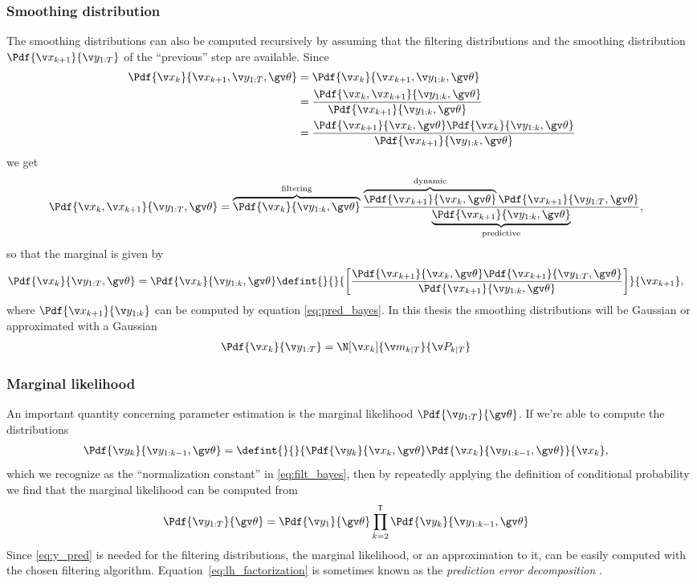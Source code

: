 \subsubsection*{Smoothing distribution}
The smoothing distributions can also be computed recursively by assuming that the filtering distributions
and the smoothing distribution $\Pdf{\x_{k+1}}{\y_{1:T}}$ of the ``previous'' step are available.
Since
\begin{align*}
	\Pdf{\xk}{\x_{k+1},\y_{1:T},\Th}&=\Pdf{\xk}{\x_{k+1},\y_{1:k},\Th}\\
	&=\frac{\Pdf{\xk,\x_{k+1}}{\y_{1:k},\Th}}{\Pdf{\x_{k+1}}{\y_{1:k},\Th}}\\
	&=\frac{\Pdf{\x_{k+1}}{\xk,\Th}\Pdf{\xk}{\y_{1:k},\Th}}{\Pdf{\x_{k+1}}{\y_{1:k},\Th}}
\end{align*}
we get
\begin{align}
	\Pdf{\xk,\x_{k+1}}{\y_{1:T},\Th}&=\overbrace{\Pdf{\xk}{\y_{1:k},\Th}}^\text{filtering}\frac{\overbrace{\Pdf{\x_{k+1}}{\xk,\Th}}^\text{dynamic}\Pdf{\x_{k+1}}{\y_{1:T},\Th}}{\underbrace{\Pdf{\x_{k+1}}{\y_{1:k},\Th}}_\text{predictive}},
	\label{eq:smooth_joint_bayes}
\end{align}
so that the marginal is given by
\begin{align}
	\Pdf{\xk}{\y_{1:T},\Th}&=\Pdf{\xk}{\y_{1:k},\Th}\defint{}{}{\left[\frac{\Pdf{\x_{k+1}}{\xk,\Th}\Pdf{\x_{k+1}}{\y_{1:T},\Th}}{\Pdf{\x_{k+1}}{\y_{1:k},\Th}}\right]}{\x_{k+1}},
	\label{eq:smooth_bayes}
\end{align}
where $\Pdf{\x_{k+1}}{\y_{1:k}}$ can be computed by equation \eqref{eq:pred_bayes}.
In this thesis the smoothing distributions will be Gaussian or approximated with a Gaussian
\begin{align}
	\Pdf{\xk}{\y_{1:T}}&=\N[\xk]{\m_{k|T}}{\P_{k|T}}
	\label{eq:smoothing_gaussian}
\end{align}

\subsubsection*{Marginal likelihood}

An important quantity concerning parameter estimation is the marginal likelihood $\Pdf{\Y}{\Th}$. 
If we're able to compute the distributions
\begin{align}
	\Pdf{\y_k}{\y_{1:k-1},\Th}&=\defint{}{}{\Pdf{\yk}{\xk,\Th}\Pdf{\xk}{\y_{1:k-1},\Th}}{\xk},
	\label{eq:y_pred}
\end{align}
which we recognize as the ``normalization constant'' in \eqref{eq:filt_bayes},
then by repeatedly applying the definition of conditional probability 
we find that the marginal likelihood can be computed from
\begin{align}
	\Pdf{\Y}{\Th}&=\Pdf{\y_1}{\Th}\prod_{k=2}^\tr \Pdf{\y_k}{\y_{1:k-1},\Th}
	\label{eq:lh_factorization}
\end{align}
Since \eqref{eq:y_pred} is needed for the filtering distributions, the marginal likelihood, or an approximation to it, can be easily
computed with the chosen filtering algorithm. Equation~\eqref{eq:lh_factorization} is sometimes known 
as the \emph{prediction error decomposition} \parencite{Harvey1990}.





